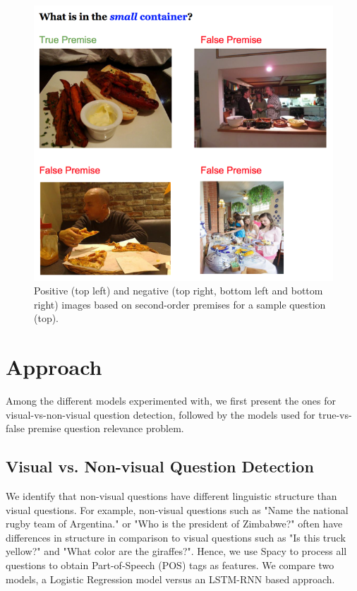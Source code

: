 \begin{figure}[t]
\begin{center}
  \includegraphics[width=0.9\linewidth]{images/Second_Order.png}
\end{center}
   \caption{Positive (top left) and negative (top right, bottom left and bottom right) images based on second-order premises for a sample question (top).}
\label{fig:second_order}
\end{figure}

\section{Approach}

Among the different models experimented with, we first present the ones for visual-vs-non-visual question detection, followed by the models used for true-vs-false premise question relevance problem.

\subsection{Visual vs. Non-visual Question Detection}
We identify that non-visual questions have different linguistic structure than visual questions. For example, non-visual questions such as "Name the national rugby team of Argentina." or "Who is the president of Zimbabwe?" often have differences in structure in comparison to visual questions such as "Is this truck yellow?" and "What color are the giraffes?". Hence, we use Spacy \cite{spacy} to process all questions to obtain Part-of-Speech (POS) tags as features. We compare two models, a Logistic Regression model versus an LSTM-RNN based approach.

